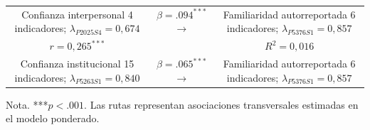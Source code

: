 \begin{center}
\renewcommand{\arraystretch}{1.5}
\begin{tabular}{c c c}
\fbox{\parbox{4cm}{\centering Confianza interpersonal\\4 indicadores; $\lambda_{P2025S4}=0{,}674$}} &
\(\beta=.094^{***}\)\(\longrightarrow\) &
\fbox{\parbox{4cm}{\centering Familiaridad autorreportada\\6 indicadores; $\lambda_{P5376S1}=0{,}857$}}\\
\(r=0{,}265^{***}\) & & \(R^2=0{,}016\)\\
\fbox{\parbox{4cm}{\centering Confianza institucional\\15 indicadores; $\lambda_{P5263S1}=0{,}840$}} &
\(\beta=.065^{***}\)\(\longrightarrow\) &
\fbox{\parbox{4cm}{\centering Familiaridad autorreportada\\6 indicadores; $\lambda_{P5376S1}=0{,}857$}}\\
\end{tabular}
\end{center}
\vspace{-1em}
\begin{center}\footnotesize Nota. ***\(p<.001\). Las rutas representan asociaciones transversales estimadas en el modelo ponderado.\end{center}
